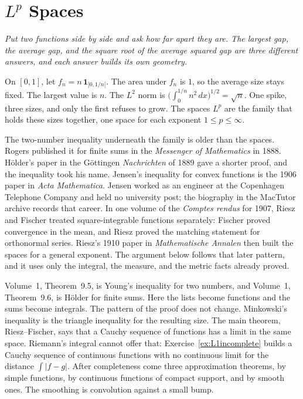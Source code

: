 \chapter{\texorpdfstring{$L^p$}{Lp} Spaces}\label{ch:lp}

\begin{center}\itshape
Put two functions side by side and ask how far apart they are. The largest gap, the average gap, and the square root of the average squared gap are three different answers, and each answer builds its own geometry.
\end{center}

On $[0,1]$, let $f_n=n\,\mathbf 1_{]0,1/n[}$. The area under $f_n$ is $1$, so the average size stays fixed. The largest value is $n$. The $L^2$ norm is $\bigl(\int_0^{1/n}n^2\,dx\bigr)^{1/2}=\sqrt n$. One spike, three sizes, and only the first refuses to grow. The spaces $L^p$ are the family that holds these sizes together, one space for each exponent $1\le p\le\infty$.

The two-number inequality underneath the family is older than the spaces. Rogers published it for finite sums in the \emph{Messenger of Mathematics} in 1888. Hölder's paper in the Göttingen \emph{Nachrichten} of 1889 gave a shorter proof, and the inequality took his name. Jensen's inequality for convex functions is the 1906 paper in \emph{Acta Mathematica}. Jensen worked as an engineer at the Copenhagen Telephone Company and held no university post; the biography in the MacTutor archive records that career. In one volume of the \emph{Comptes rendus} for 1907, Riesz and Fischer treated square-integrable functions separately: Fischer proved convergence in the mean, and Riesz proved the matching statement for orthonormal series. Riesz's 1910 paper in \emph{Mathematische Annalen} then built the spaces for a general exponent. The argument below follows that later pattern, and it uses only the integral, the measure, and the metric facts already proved.

Volume~1, Theorem~9.5, is Young's inequality for two numbers, and Volume~1, Theorem~9.6, is Hölder for finite sums. Here the lists become functions and the sums become integrals. The pattern of the proof does not change. Minkowski's inequality is the triangle inequality for the resulting size. The main theorem, Riesz--Fischer, says that a Cauchy sequence of functions has a limit in the same space. Riemann's integral cannot offer that: Exercise~\ref{ex:L1incomplete} builds a Cauchy sequence of continuous functions with no continuous limit for the distance $\int|f-g|$. After completeness come three approximation theorems, by simple functions, by continuous functions of compact support, and by smooth ones. The smoothing is convolution against a small bump.

